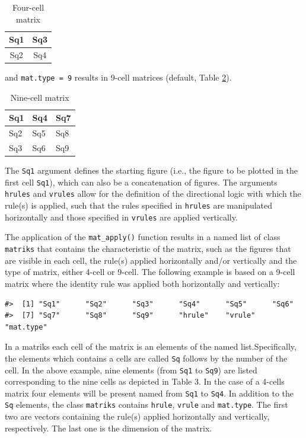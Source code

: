 \begin{table}

\caption{\label{tab:fourCell-static}Four-cell matrix}
\centering
\begin{tabular}[t]{c|c}
\hline
Sq1 & Sq3\\
\hline
Sq2 & Sq4\\
\hline
\end{tabular}
\end{table}

and \texttt{mat.type\ =\ 9} results in 9-cell matrices (default, Table \ref{tab:nineCell-static}).

\begin{table}

\caption{\label{tab:nineCell-static}Nine-cell matrix}
\centering
\begin{tabular}[t]{l|l|l}
\hline
Sq1 & Sq4 & Sq7\\
\hline
Sq2 & Sq5 & Sq8\\
\hline
Sq3 & Sq6 & Sq9\\
\hline
\end{tabular}
\end{table}

The \texttt{Sq1} argument defines the starting figure (i.e., the figure to be plotted in the first cell \texttt{Sq1}), which can also be a concatenation of figures.
The arguments \texttt{hrules} and \texttt{vrules} allow for the definition of the directional logic with which the rule(s) is applied, such that the rules specified in \texttt{hrules} are manipulated horizontally and those specified in \texttt{vrules} are applied vertically.

The application of the \texttt{mat\_apply()} function results in a named list of class \texttt{matriks} that contains the characteristic of the matrix, such as the figures that are visible in each cell, the rule(s) applied horizontally and/or vertically and the type of matrix, either 4-cell or 9-cell.
The following example is based on a 9-cell matrix where the identity rule was applied both horizontally and vertically:

\begin{verbatim}
#>  [1] "Sq1"      "Sq2"      "Sq3"      "Sq4"      "Sq5"      "Sq6"     
#>  [7] "Sq7"      "Sq8"      "Sq9"      "hrule"    "vrule"    "mat.type"
\end{verbatim}

In a matriks each cell of the matrix is an elements of the named list.Specifically, the elements which contains a cells are called \texttt{Sq} follows by the number of the cell.
In the above example, nine elements (from \texttt{Sq1} to \texttt{Sq9}) are listed corresponding to the nine cells as depicted in Table 3.
In the case of a 4-cells matrix four elements will be present named from \texttt{Sq1} to \texttt{Sq4}.
In addition to the \texttt{Sq} elements, the class \texttt{matriks} contains \texttt{hrule}, \texttt{vrule} and \texttt{mat.type}.
The first two are vectors containing the rule(s) applied horizontally and vertically, respectively.
The last one is the dimension of the matrix.

